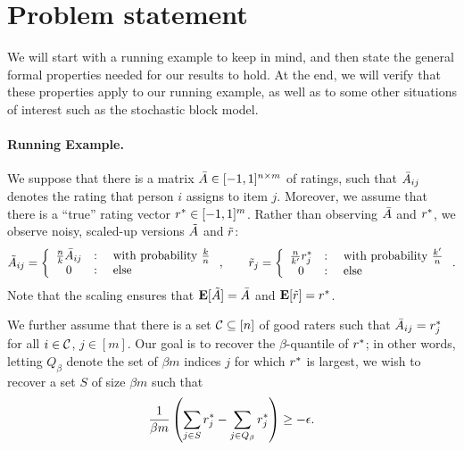 \section{Problem statement}
\label{sec:assumptions}

We will start with a running example to keep in mind, and 
then state the general formal properties needed for our 
results to hold. At the end, we will verify that these properties 
apply to our running example, as well as to some other situations 
of interest such as the stochastic block model.

\paragraph{Running Example.}
We suppose that there is a matrix 
$\bar{A} \in [-1,1]^{n \times m}$ of ratings, such that $\bar{A}_{ij}$ 
denotes the rating that person $i$ assigns to item $j$. 
Moreover, we assume that there is a ``true'' rating vector $r^* \in [-1,1]^m$.
Rather than observing $\bar{A}$ and $r^*$, we observe noisy, scaled-up 
versions $\tilde{A}$ and $\tilde{r}$:
\[ \tilde{A}_{ij} = \left\{ \begin{array}{ccl} \frac{n}{k}\bar{A}_{ij} & : & \text{ with probability $\frac{k}{n}$} \\ 0 & : & \text{ else} \end{array} \right., \quad\quad 
  \tilde{r}_j = \left\{ \begin{array}{ccl} \frac{n}{k'}r^*_j & : & \text{ with probability $\frac{k'}{n}$} \\ 0 & : & \text{ else} \end{array} \right.. \] %
Note that the scaling ensures that $\mathbf{E}[\tilde{A}] = \bar{A}$ and $\mathbf{E}[\tilde{r}] = r^*$. 

We further assume that there is a set $\mathcal{C} \subseteq [n]$ of good raters such 
that $\bar{A}_{ij} = r^*_j$ for all $i \in \mathcal{C}$, $j \in [m]$. Our goal is to 
recover the $\beta$-quantile of $r^*$; in other words, letting $Q_{\beta}$ 
denote the set of $\beta m$ indices $j$ for which $r^*$ is largest, we 
wish to recover a set $S$ of size $\beta m$ such that
\[ \frac{1}{\beta m}\left( \sum_{j \in S} r^*_j - \sum_{j \in Q_{\beta}} r^*_j \right) \geq - \epsilon. \]

